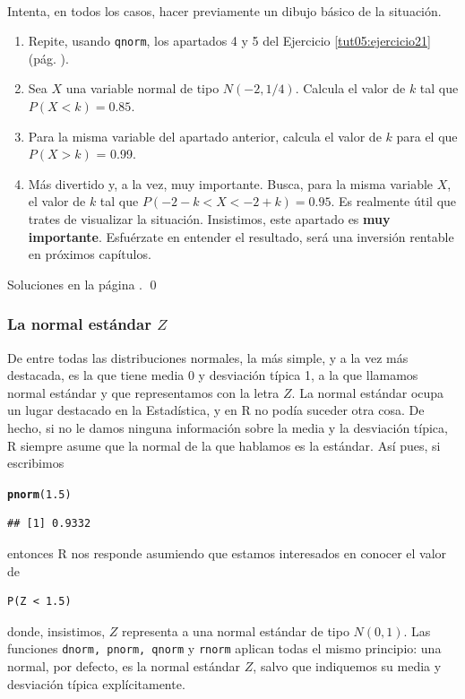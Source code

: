 \documentclass[10pt,a4paper]{article}\usepackage[]{graphicx}\usepackage[]{color}
\makeatletter
\newcommand{\hlnum}[1]{\textcolor[rgb]{0.686,0.059,0.569}{#1}}%
\newcommand{\hlstd}[1]{\textcolor[rgb]{0.345,0.345,0.345}{#1}}%
\newcommand{\hlkwd}[1]{\textcolor[rgb]{0.737,0.353,0.396}{\textbf{#1}}}%
\newenvironment{kframe}{%
 \def\at@end@of@kframe{}%
 \ifinner\ifhmode%
  \def\at@end@of@kframe{\end{minipage}}%
  \begin{minipage}{\columnwidth}%
 \fi\fi%
 \def\FrameCommand##1{\hskip\@totalleftmargin \hskip-\fboxsep
 \colorbox{shadecolor}{##1}\hskip-\fboxsep
     \hskip-\linewidth \hskip-\@totalleftmargin \hskip\columnwidth}%
 \MakeFramed {\advance\hsize-\width
   \@totalleftmargin\z@ \linewidth\hsize
   \@setminipage}}%
 {\par\unskip\endMakeFramed%
 \at@end@of@kframe}
\newenvironment{knitrout}{}{} %
\makeatother
\begin{document}
\begin{ejercicio}
\label{tut05:ejercicio23}
\quad\\
Intenta, en todos los casos, hacer previamente un dibujo básico de la situación.
\begin{enumerate}
  \item Repite, usando {\tt qnorm}, los apartados 4 y 5 del Ejercicio \ref{tut05:ejercicio21} (pág. \pageref{tut05:ejercicio21}).
  \item Sea $X$ una variable normal de tipo $N(-2, 1/4)$. Calcula el valor de $k$ tal que $P(X < k) = 0.85$.
  \item Para la misma variable del apartado anterior, calcula el valor de $k$ para el que $P(X > k)$ = 0.99.
  \item Más divertido y, a la vez, muy importante. Busca, para la misma variable $X$, el valor de $k$ tal que $P( -2-k < X < -2 + k)=0.95$. Es realmente útil que trates de visualizar la situación. Insistimos, este apartado es {\bf muy importante}. Esfuérzate en entender el resultado, será una inversión rentable en próximos capítulos.
\end{enumerate}
Soluciones en la página \pageref{tut05:ejercicio23:sol}.
\qed
\end{ejercicio}


\subsubsection*{La normal estándar $Z$}

De entre todas las distribuciones normales, la más simple, y a la vez más destacada, es la que tiene media 0 y desviación típica 1, a la que llamamos normal estándar y que representamos con la letra $Z$. La normal estándar ocupa un lugar destacado en la Estadística, y en R no podía suceder otra cosa. De hecho, si no le damos ninguna información sobre la media y la desviación típica, R siempre asume que la normal de la que hablamos es la estándar. Así pues, si escribimos
\begin{knitrout}
\color{fgcolor}\begin{kframe}
\begin{alltt}
\hlkwd{pnorm}\hlstd{(}\hlnum{1.5}\hlstd{)}
\end{alltt}
\begin{verbatim}
## [1] 0.9332
\end{verbatim}
\end{kframe}
\end{knitrout}
entonces R nos responde asumiendo que estamos interesados en conocer el valor de
\begin{verbatim}
P(Z < 1.5)
\end{verbatim}
donde, insistimos, $Z$ representa a una normal estándar de tipo $N(0,1)$. Las funciones {\tt dnorm, pnorm, qnorm} y {\tt rnorm} aplican todas el mismo principio: una normal, por defecto, es la normal estándar $Z$, salvo que indiquemos su media y desviación típica explícitamente.
\end{document}
